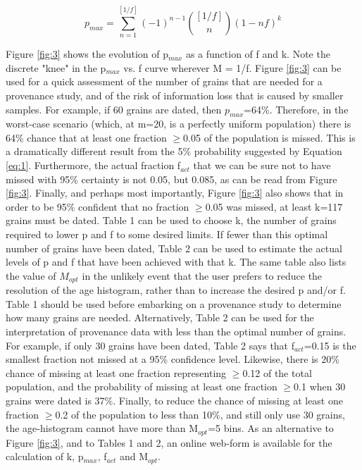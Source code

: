 \documentclass[12]{article}
\begin{document}
\begin{equation}
  \label{eq:4}
p_{max}  =  \sum_{n=1}^{[1/f]}(-1)^{n-1} 
            \binom{[1/f]}{n}  (1-nf)^k
\end{equation}

Figure \ref{fig:3} shows the evolution of p$_{max}$ as a function of f
and k. Note the discrete "knee" in the p$_{max}$ vs.  f curve wherever
M = 1/f.  Figure \ref{fig:3} can be used for a quick assessment of the
number of  grains that are needed  for a provenance study,  and of the
risk  of information  loss that  is  caused by  smaller samples.   For
example, if  60 grains are dated, then  $p_{max}$=64\%.  Therefore, in
the  worst-case  scenario (which,  at  m=20,  is  a perfectly  uniform
population) there is 64\% chance that at least one fraction $\geq$0.05
of the population is missed.   This is a dramatically different result
from   the   5\%  probability   suggested   by  Equation   \ref{eq:1}.
Furthermore, the actual fraction f$_{act}$  that we can be sure not to
have missed with 95\% certainty is not 0.05, but 0.085, as can be read
from  Figure  \ref{fig:3}.   Finally,  and perhaps  most  importantly,
Figure \ref{fig:3} also shows that  in order to be 95\% confident that
no  fraction $\geq$0.05  was missed,  at  least k=117  grains must  be
dated. Table 1 can be used  to choose k, the number of grains required
to lower  p and f to some  desired limits. If fewer  than this optimal
number of grains have been dated,  Table 2 can be used to estimate the
actual levels  of p and  f that have  been achieved with that  k.  The
same table  also lists  the value of  $M_{opt}$ in the  unlikely event
that the user  prefers to reduce the resolution  of the age histogram,
rather than  to increase the  desired p and/or  f.  Table 1  should be
used  before embarking  on a  provenance study  to determine  how many
grains  are  needed.  Alternatively,  Table  2  can  be used  for  the
interpretation of provenance data with less than the optimal number of
grains.  For example, if only 30  grains have been dated, Table 2 says
that  f$_{act}$=0.15 is  the smallest  fraction not  missed at  a 95\%
confidence level.  Likewise, there is  20\% chance of missing at least
one fraction representing $\geq$0.12  of the total population, and the
probability of missing at least  one fraction $\geq$0.1 when 30 grains
were dated is 37\%.  Finally, to reduce the chance of missing at least
one fraction $\geq$0.2 of the  population to less than 10\%, and still
only  use   30  grains,  the  age-histogram  cannot   have  more  than
M$_{opt}$=5  bins.  As an  alternative to  Figure \ref{fig:3},  and to
Tables 1 and 2, an online web-form \cite{webform} is available for the
calculation of k, p$_{max}$, f$_{act}$ and M$_{opt}$.
\end{document}
